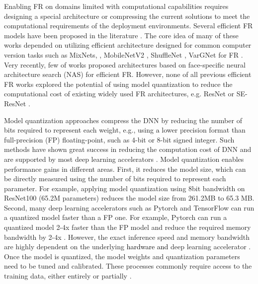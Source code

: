 \documentclass[a4paper,conference]{IEEEtran}
\begin{document}
Enabling FR on domains limited with computational capabilities requires designing a special architecture or compressing the current solutions to meet the computational requirements of the deployment environments.
Several efficient FR models have been proposed in the literature \cite{mobilefacenet,shufflefacenet,pocketnet,vargfacenet}. The core idea of many of these works depended on utilizing  efficient architecture designed for common computer version tasks such as MixNets, \cite{mixnet}, MobileNetV2 \cite{mobilenetv2}, ShuffleNet  \cite{shufflenetv2}, VarGNet \cite{vargnet} for FR \cite{mixfacenet,mobilefacenet,shufflefacenet,vargfacenet}. 
Very recently, few of works \cite{pocketnet,DBLP:conf/aaai/Wang21} proposed architectures based on face-specific neural architecture search (NAS) for efficient FR.
However, none of all previous efficient FR works \cite{mobilefacenet,shufflefacenet,mixfacenet,vargfacenet,pocketnet,DBLP:conf/aaai/Wang21} explored the potential of using model quantization to reduce the computational cost of existing widely used FR architectures, e.g. ResNet \cite{resnet,deng2019arcface} or SE-ResNet \cite{senet,DBLP:conf/fgr/CaoSXPZ18}. 

Model quantization approaches compress the DNN by reducing the number of bits required to represent each weight, e.g., using \textcolor{black}{a} lower precision format than full-precision (FP) floating-point, such as 4-bit \cite{banner2018post, yao2021hawq} or 8-bit \cite{krishnamoorthi2018quantizing, jacob2018quantization} signed integer.  
Such methods have shown great success in reducing the computation cost of DNN and are supported by most deep learning accelerators \cite{NEURIPS2019_9015,DBLP:conf/osdi/AbadiBCCDDDGIIK16}.
Model quantization enables performance gains in different areas. 
First, it reduces the model size, which can be directly measured using the number of bits required to represent each parameter. For example, applying model quantization using 8bit bandwidth on ResNet100 \cite{resnet,deng2019arcface}  (65.2M parameters) reduces the  model size from 261.2MB to 65.3 MB.
Second, many deep learning accelerators such as Pytorch \cite{NEURIPS2019_9015} and TensorFlow \cite{DBLP:conf/osdi/AbadiBCCDDDGIIK16} can run a quantized model faster than a FP one. For example, Pytorch \cite{NEURIPS2019_9015} can run a quantized model 2-4x faster than the FP model and reduce the required memory bandwidth by 2-4x \cite{NEURIPS2019_9015,krishnamoorthi2018quantizing}. However, the exact inference speed and memory bandwidth are highly dependent on the underlying \textcolor{black}{hardware and} deep learning accelerator \cite{NEURIPS2019_9015}. 
Once the model is quantized, the model weights and quantization parameters need to be tuned and calibrated.
These processes commonly require access to the training data, either entirely or partially \cite{choukroun2019low}. 
\end{document}
